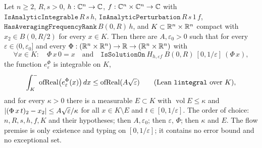 \begin{theorem}\label{bpN:p0:avg-mean}
Let $n\ge2$, $R,s>0$, $h:\mathbb{C}^n\to\mathbb{C}$, $f:\mathbb{C}^n\times\mathbb{C}^n\to\mathbb{C}$ with $\texttt{IsAnalyticIntegrable}\,R\,s\,h$, $\texttt{IsAnalyticPerturbation}\,R\,s\,1\,f$,
$\texttt{HasAveragingFrequencyRank}\,B(0,R)\,h$, and $K\subset\mathbb{R}^n\times\mathbb{R}^n$ compact with $x_2\in B(0,R/2)$ for every $x\in K$. Then there are $A,\varepsilon_0>0$ such that for every $\varepsilon\in(0,\varepsilon_0]$ and
every $\Phi:(\mathbb{R}^n\times\mathbb{R}^n)\to\mathbb{R}\to(\mathbb{R}^n\times\mathbb{R}^n)$ with
\[\forall x\in K:\quad\Phi\,x\,0=x\quad\text{and}\quad\texttt{IsSolutionOn}\ H_{h,\varepsilon f}\ B(0,R)\ [0,1/\varepsilon]\ (\Phi\,x),\]
the function $e^\Phi_\varepsilon$ is integrable on $K$,
\[\int_K^{-}\operatorname{ofReal}\bigl(e^\Phi_\varepsilon(x)\bigr)\,dx\le\operatorname{ofReal}(A\sqrt\varepsilon)\qquad(\text{Lean \texttt{lintegral} over }K),\]
and for every $\kappa>0$ there is a measurable $E\subset K$ with $\operatorname{vol}E\le\kappa$ and $\lvert (\Phi\,x\,t)_2-x_2\rvert\le A\sqrt\varepsilon/\kappa$ for all $x\in K\setminus E$ and $t\in[0,1/\varepsilon]$.
The order of choice: $n,R,s,h,f,K$ and their hypotheses; then $A,\varepsilon_0$; then $\varepsilon$, $\Phi$; then $\kappa$ and $E$. The flow premise is only existence and typing on $[0,1/\varepsilon]$; it contains no error bound and no exceptional set.
\end{theorem}


